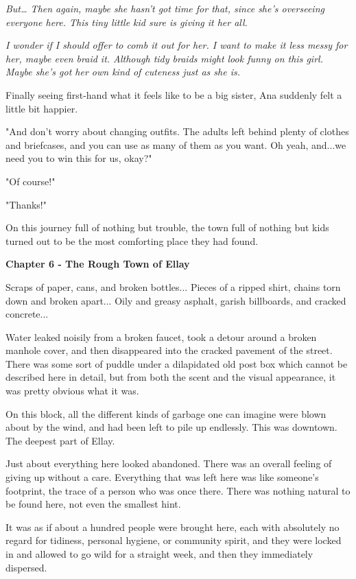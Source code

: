 \documentclass[
]{article}
\begin{document}
\emph{But\ldots{} Then again, maybe she hasn't got time for that, since
she's overseeing everyone here. This tiny little kid sure is giving it
her all.}

\emph{I wonder if I should offer to comb it out for her. I want to make
it less messy for her, maybe even braid it. Although tidy braids might
look funny on this girl. Maybe she's got her own kind of cuteness just
as she is.}

Finally seeing first-hand what it feels like to be a big sister, Ana
suddenly felt a little bit happier.

"And don't worry about changing outfits. The adults left behind plenty
of clothes and briefcases, and you can use as many of them as you want.
Oh yeah, and...we need you to win this for us, okay?"

"Of course!"

"Thanks!"

On this journey full of nothing but trouble, the town full of nothing
but kids turned out to be the most comforting place they had found.

\textbf{Chapter 6 - The Rough Town of Ellay}

Scraps of paper, cans, and broken bottles... Pieces of a ripped shirt,
chains torn down and broken apart... Oily and greasy asphalt, garish
billboards, and cracked concrete...

Water leaked noisily from a broken faucet, took a detour around a broken
manhole cover, and then disappeared into the cracked pavement of the
street. There was some sort of puddle under a dilapidated old post box
which cannot be described here in detail, but from both the scent and
the visual appearance, it was pretty obvious what it was.

On this block, all the different kinds of garbage one can imagine were
blown about by the wind, and had been left to pile up endlessly. This
was downtown. The deepest part of Ellay.

Just about everything here looked abandoned. There was an overall
feeling of giving up without a care. Everything that was left here was
like someone's footprint, the trace of a person who was once there.
There was nothing natural to be found here, not even the smallest hint.

It was as if about a hundred people were brought here, each with
absolutely no regard for tidiness, personal hygiene, or community
spirit, and they were locked in and allowed to go wild for a straight
week, and then they immediately dispersed.
\end{document}
